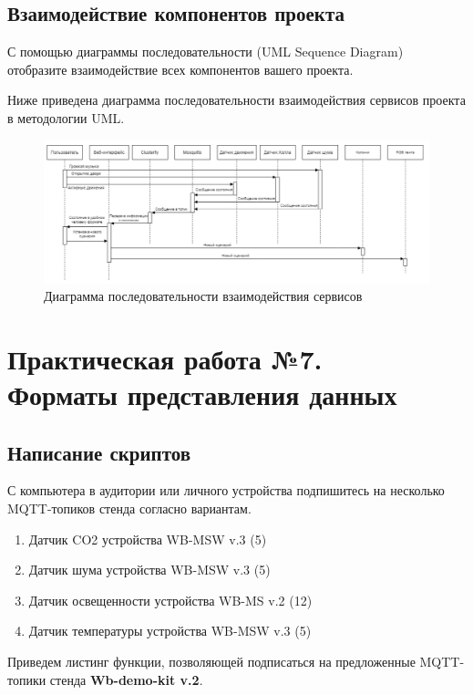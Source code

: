 \documentclass[a4paper,14pt]{extarticle}
\newcommand{\stend}{\textbf{Wb-demo-kit v.2}}
\begin{document}
\subsection{Взаимодействие компонентов проекта}
\begin{problem}
	
	С помощью диаграммы последовательности (UML Sequence Diagram) отобразите
	взаимодействие всех компонентов вашего проекта. 
	
	\nonum
	Ниже приведена диаграмма последовательности взаимодействия сервисов проекта в методологии UML.
	\begin{figure}[htpb]
		\centering
		\includegraphics[width=0.8\linewidth]{images/sql-6}
		\caption{Диаграмма последовательности взаимодействия сервисов}
		\label{fig:sql-6}
	\end{figure}
\end{problem}

\newpage

\section{Практическая работа №7.\\ Форматы представления данных }

\subsection{Написание скриптов}
\begin{problem}
	С компьютера в аудитории или личного устройства подпишитесь на несколько
	MQTT-топиков стенда согласно вариантам.
	\begin{enumerate}
		\item Датчик CO2 устройства WB-MSW v.3 (5)
		\item Датчик шума устройства WB-MSW v.3 (5)
		\item Датчик освещенности устройства WB-MS v.2 (12)
		\item Датчик температуры устройства WB-MSW v.3 (5)
	\end{enumerate}
	\nonum Приведем листинг функции, позволяющей подписаться на предложенные MQTT-топики стенда \stend.




\end{problem}
\end{document}
